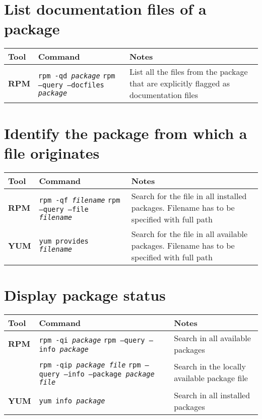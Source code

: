 \documentclass[10pt]{article}
\begin{document}
\section{List documentation files of a package}
\begin{tabular}{ p{3.5cm} p{9cm} p{11cm}}
  \hline
  \rowcolor{Gray}
  \textbf{Tool} & \textbf{Command} & \textbf{Notes} \\
  \hline 
  \textbf{RPM} & \texttt{rpm -qd \textit{package}} \newline \texttt{rpm --query --docfiles \textit{package}} & List all the files from the package that are explicitly flagged as documentation files\\
  \hline
\end{tabular}
\newpage

\cheatsheet

\section{Identify the package from which a file originates}
\begin{tabular}{ p{3.5cm} p{9cm} p{11cm}}
  \hline
  \rowcolor{Gray}
  \textbf{Tool} & \textbf{Command} & \textbf{Notes} \\
  \hline 
  \textbf{RPM} & \texttt{rpm -qf \textit{filename}} \newline \texttt{rpm --query --file \textit{filename}} & Search for the file in all installed packages. Filename has to be specified with full path\\
  \rowcolor{Gray}
  \textbf{YUM} & \texttt{yum provides \textit{filename}} & Search for the file in all available packages. Filename has to be specified with full path\\
  \hline
\end{tabular}

\section{Display package status}
\begin{tabular}{ p{3.5cm} p{9cm} p{11cm}}
  \hline
  \rowcolor{Gray}
  \textbf{Tool} & \textbf{Command} & \textbf{Notes} \\
  \hline 
  \textbf{RPM} & \texttt{rpm -qi \textit{package}} \newline \texttt{rpm --query --info \textit{package}} & Search in all available packages\\
  \rowcolor{Gray}
  & \texttt{rpm -qip \textit{package file}} \newline \texttt{rpm --query --info --package \textit{package file}} & Search in the locally available package file\\
  \textbf{YUM} & \texttt{yum info \textit{package}} & Search in all installed packages\\
  \hline
\end{tabular}
\end{document}
